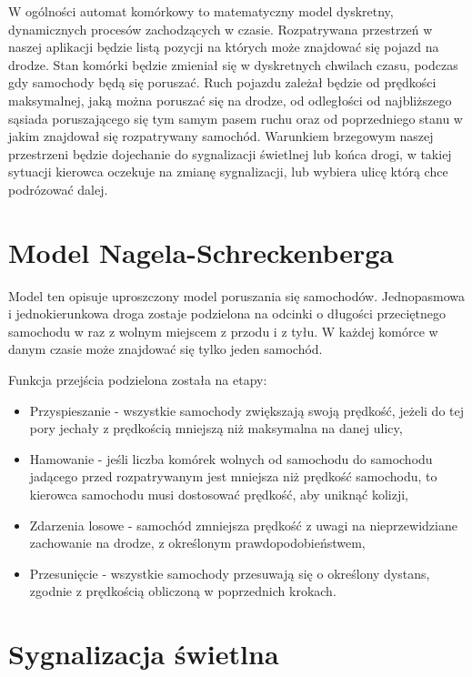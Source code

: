 \documentclass{sprawozdanie-agh}
\begin{document}
\begin{multicols}{2}
		W ogólności automat komórkowy to matematyczny model dyskretny, dynamicznych procesów zachodzących w czasie. Rozpatrywana przestrzeń w naszej aplikacji będzie listą pozycji na których może znajdować się pojazd na drodze. Stan komórki będzie zmieniał się w dyskretnych chwilach czasu, podczas gdy samochody będą się poruszać. Ruch pojazdu zależał będzie od prędkości maksymalnej, jaką można poruszać się na drodze, od odległości od najbliższego sąsiada poruszającego się tym samym pasem ruchu oraz od poprzedniego stanu w jakim znajdował się rozpatrywany samochód. Warunkiem brzegowym naszej przestrzeni będzie dojechanie do sygnalizacji świetlnej lub końca drogi, w takiej sytuacji kierowca oczekuje na zmianę sygnalizacji, lub wybiera ulicę którą chce podrózować dalej.

	\section{Model Nagela-Schreckenberga}

		Model ten opisuje uproszczony model poruszania się samochodów. Jednopasmowa i jednokierunkowa droga zostaje podzielona na odcinki o długości przeciętnego samochodu w raz z wolnym miejscem z przodu i z tyłu. W każdej komórce w danym czasie może znajdować się tylko jeden samochód.

		Funkcja przejścia podzielona została na etapy:

		\begin{itemize}
			\item Przyspieszanie - wszystkie samochody zwiększają swoją prędkość, jeżeli do tej pory jechały z prędkością mniejszą niż maksymalna na danej ulicy, 
			\item Hamowanie - jeśli liczba komórek wolnych od samochodu do samochodu jadącego przed rozpatrywanym jest mniejsza niż prędkość samochodu, to kierowca samochodu musi dostosować prędkość, aby uniknąć kolizji,
			\item Zdarzenia losowe - samochód zmniejsza prędkość z uwagi na nieprzewidziane zachowanie na drodze, z określonym prawdopodobieństwem,
			\item Przesunięcie - wszystkie samochody przesuwają się o określony dystans, zgodnie z prędkością obliczoną w poprzednich krokach.
		\end{itemize}

	\section{Sygnalizacja świetlna}


\end{multicols}
\end{document}
